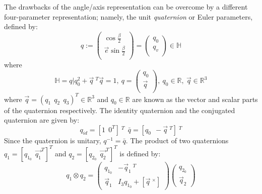  The drawbacks of the angle/axis representation can be overcome by a different four-parameter representation; namely, the unit \emph{quaternion} or Euler parameters, defined by:
 \begin{equation}\label{defquaternion}
         q:=\left(%
 \begin{array}{c}
   \cos \frac{\beta}{2} \\
   \vec{e} \sin \frac{\beta}{2}  \\
 \end{array}%
 \right)=\left(\begin{array}{c}
   q_0 \\
   q_v  \\
 \end{array}\right)   \in \mathbb H
 \end{equation} where
 \begin{equation}\label{H}
   \mathbb H={q|q_0^2+\vec{q}\ ^T\vec{q}=1, \ q=\left(\begin{array}{c}
   q_0 \\
   \vec{q}  \\
 \end{array}\right), \ q_0\in\mathbb{R}, \ \vec{q}\in\mathbb{R}^3}
 \end{equation} where $\vec{q}=(q_1\ \ q_2 \ \ q_3)^T \in \mathbb R^3 $ and $q_0 \in \mathbb R$ are known as the vector and scalar parts of the quaternion respectively. The identity quaternion and the conjugated quaternion are given by:
 \begin{equation}\label{qid}
   q_{id}=[1 \ \ 0^T]\ ^T \ \ \bar{q}=[q_0 \ \ -\vec{q}\ ^T]\ ^T
 \end{equation}
 Since the quaternion is unitary, $q^{-1}=\bar{q}$.
 The product of two quaternions $q_1=[q_{1_{0}} \ \ \vec{q_1}^T]^T$ and $q_2=[q_{2_{0}} \ \ \vec{q_2}^T]^T$ is defined by:
 \begin{equation}\label{multiq}
   q_1\otimes q_2=\left(\begin{array}{cc}
                          q_{1_{0}} & -\vec{q}_1\ ^T \\
                          \vec{q}_1 & I_3q_{1_{0}}+[\vec{q}\ ^\times]
                        \end{array}\right)\left(\begin{array}{c}
                                                  q_{2_{0}} \\
                                                  \vec{q}_2 \end{array}\right)
 \end{equation}

